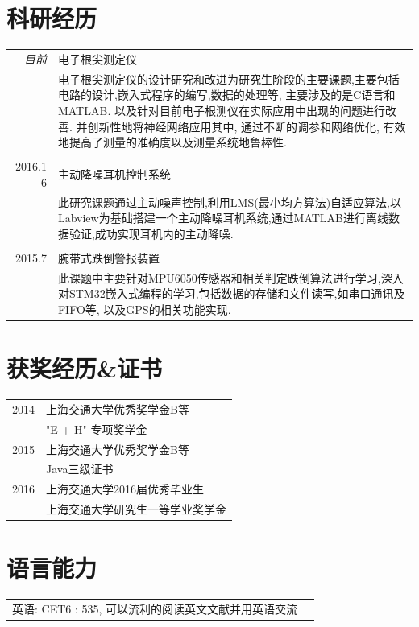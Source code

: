 \documentclass[a4paper,11pt]{article}
\begin{document}
\section{科研经历}
\begin{tabular}{r|p{11cm}}
 \emph{目前} & 电子根尖测定仪 \\&\footnotesize{电子根尖测定仪的设计研究和改进为研究生阶段的主要课题,主要包括电路的设计,嵌入式程序的编写,数据的处理等, 主要涉及的是C语言和MATLAB. 以及针对目前电子根测仪在实际应用中出现的问题进行改善. 并创新性地将神经网络应用其中, 通过不断的调参和网络优化, 有效地提高了测量的准确度以及测量系统地鲁棒性.}\\\multicolumn{2}{c}{} \\
 \textsc{2016.1 - 6} & 主动降噪耳机控制系统 \\&\footnotesize{此研究课题通过主动噪声控制,利用LMS(最小均方算法)自适应算法,以Labview为基础搭建一个主动降噪耳机系统,通过MATLAB进行离线数据验证,成功实现耳机内的主动降噪.}\\\multicolumn{2}{c}{} \\
\textsc{2015.7} & 腕带式跌倒警报装置\\&\footnotesize{此课题中主要针对MPU6050传感器和相关判定跌倒算法进行学习,深入对STM32嵌入式编程的学习,包括数据的存储和文件读写,如串口通讯及FIFO等, 以及GPS的相关功能实现.}
\end{tabular}

\section{获奖经历\&证书}
\begin{tabular}{rl}
 \textsc{2014}  & 上海交通大学优秀奖学金B等\\
& "E + H" 专项奖学金\\
 \textsc{2015} & 上海交通大学优秀奖学金B等\\
&  Java三级证书\\
 \textsc{2016} & 上海交通大学2016届优秀毕业生\\
&  上海交通大学研究生一等学业奖学金\\

\end{tabular}

\section{语言能力}
\begin{tabular}{rl}
英语: CET6 : 535, 可以流利的阅读英文文献并用英语交流\\
\end{tabular}
\end{document}
